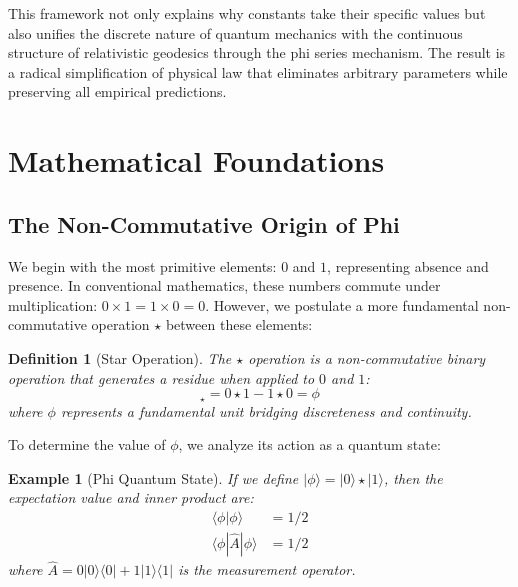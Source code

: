 \documentclass{article}
\newtheorem{theorem}{Theorem}
\newtheorem{theorem}{Example}
\newtheorem{definition}{Definition}
\begin{document}
This framework not only explains why constants take their specific values but also unifies the discrete nature of quantum mechanics with the continuous structure of relativistic geodesics through the phi series mechanism. The result is a radical simplification of physical law that eliminates arbitrary parameters while preserving all empirical predictions.

\section{Mathematical Foundations}

\subsection{The Non-Commutative Origin of Phi}

We begin with the most primitive elements: $0$ and $1$, representing absence and presence. In conventional mathematics, these numbers commute under multiplication: $0 \times 1 = 1 \times 0 = 0$. However, we postulate a more fundamental non-commutative operation $\star$ between these elements:

\begin{definition}[Star Operation]
The $\star$ operation is a non-commutative binary operation that generates a residue when applied to $0$ and $1$:
\begin{equation}
[0, 1]_\star = 0 \star 1 - 1 \star 0 = \phi
\end{equation}
where $\phi$ represents a fundamental unit bridging discreteness and continuity.
\end{definition}

To determine the value of $\phi$, we analyze its action as a quantum state:

\begin{theorem}[Phi Quantum State]
If we define $|\phi\rangle = |0\rangle \star |1\rangle$, then the expectation value and inner product are:
\begin{align}
\langle\phi|\phi\rangle &= 1/2\\
\langle\phi|\hat{A}|\phi\rangle &= 1/2
\end{align}
where $\hat{A} = 0|0\rangle\langle 0| + 1|1\rangle\langle 1|$ is the measurement operator.
\end{theorem}
\end{document}
